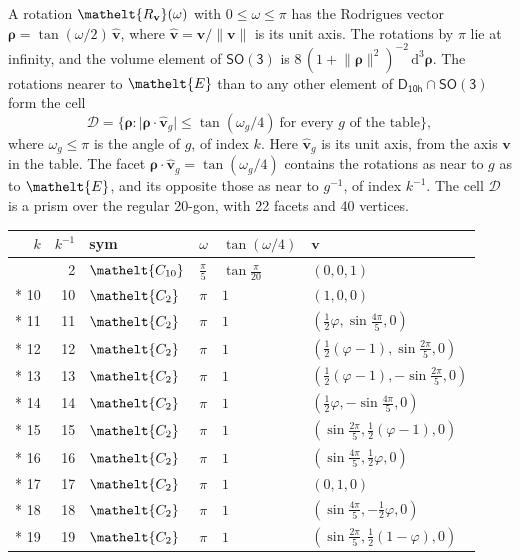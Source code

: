 \documentclass[10pt,a4paper]{article}
\numberwithin{equation}{section}
\newcommand{\eltfont}[1]{{\let\sigma\eltsigma\mathelt{#1}}}
\newcommand{\grp}[1]{\mathsf{#1}}
\newcommand{\cls}[1]{\eltfont{#1}}
\newcommand{\elt}[1]{\eltfont{#1}}
\newcommand{\dirvec}[3]{(#1, #2, #3)}
\newcommand{\unitaxis}{\hat{\mathbf{v}}}
\newcommand{\vv}{\mathbf{v}}
\newcommand{\diff}{\mathrm{d}}
\newcommand{\goldenratio}{\varphi}
\newcommand{\rodrigues}{\boldsymbol{\rho}}
\newcommand{\fcell}{\mathcal{D}}
\begin{document}
\leavevmode\label{n:vector.rodrigues}\label{n:vector.unitaxis}A rotation $\elt{R_{\vv}}(\omega)$ with $0 \le \omega \le \pi$ has the Rodrigues vector $\rodrigues = \tan(\omega/2)\,\unitaxis$, where $\unitaxis = \vv/\lVert\vv\rVert$ is its unit axis. The rotations by $\pi$ lie at infinity, and the volume element of \href{SO3.pdf}{$\grp{SO(3)}$} is $8\,(1 + \lVert\rodrigues\rVert^2)^{-2}\,\diff^3\rodrigues$.
\leavevmode\label{n:set.cell}The rotations nearer to $\elt{E}$ than to any other element of $\grp{D_{10h}} \cap \grp{SO(3)}$ form the cell
\begin{equation}\label{e:cell}\fcell = \bigl\{\rodrigues : \lvert\rodrigues\cdot\unitaxis_g\rvert \le \tan(\omega_g/4)\ \text{for every $g$ of the table}\bigr\},\end{equation}
where $\omega_g \le \pi$ is the angle of $g$, of index $k$. Here $\unitaxis_g$ is its unit axis, from the axis $\vv$ in the table. The facet $\rodrigues\cdot\unitaxis_g = \tan(\omega_g/4)$ contains the rotations as near to $g$ as to $\elt{E}$, and its opposite those as near to $g^{-1}$, of index $k^{-1}$. The cell $\fcell$ is a prism over the regular 20-gon, with 22 facets and 40 vertices.
{\small{\renewcommand{\arraystretch}{1.3}\begin{longtable}{@{}rrllll@{}}\toprule
$k$ & $k^{-1}$ & sym & $\omega$ & $\tan(\omega/4)$ & $\vv$\\\midrule\endhead
\bottomrule\endfoot\endlastfoot
1 & 2 & $\cls{C_{10}}$ & $\tfrac{\pi}{5}$ & $\tan\tfrac{\pi}{20}$ & $\dirvec{0}{0}{1}$\\*
10 & 10 & $\cls{C_{2}}$ & $\pi$ & $1$ & $\dirvec{1}{0}{0}$\\*
11 & 11 & $\cls{C_{2}}$ & $\pi$ & $1$ & $\dirvec{\tfrac{1}{2}\goldenratio{}}{\sin\tfrac{4\pi}{5}}{0}$\\*
12 & 12 & $\cls{C_{2}}$ & $\pi$ & $1$ & $\dirvec{\tfrac{1}{2}(\goldenratio - 1)}{\sin\tfrac{2\pi}{5}}{0}$\\*
13 & 13 & $\cls{C_{2}}$ & $\pi$ & $1$ & $\dirvec{\tfrac{1}{2}(\goldenratio - 1)}{-\sin\tfrac{2\pi}{5}}{0}$\\*
14 & 14 & $\cls{C_{2}}$ & $\pi$ & $1$ & $\dirvec{\tfrac{1}{2}\goldenratio{}}{-\sin\tfrac{4\pi}{5}}{0}$\\*
15 & 15 & $\cls{C_{2}}$ & $\pi$ & $1$ & $\dirvec{\sin\tfrac{2\pi}{5}}{\tfrac{1}{2}(\goldenratio - 1)}{0}$\\*
16 & 16 & $\cls{C_{2}}$ & $\pi$ & $1$ & $\dirvec{\sin\tfrac{4\pi}{5}}{\tfrac{1}{2}\goldenratio{}}{0}$\\*
17 & 17 & $\cls{C_{2}}$ & $\pi$ & $1$ & $\dirvec{0}{1}{0}$\\*
18 & 18 & $\cls{C_{2}}$ & $\pi$ & $1$ & $\dirvec{\sin\tfrac{4\pi}{5}}{-\tfrac{1}{2}\goldenratio{}}{0}$\\*
19 & 19 & $\cls{C_{2}}$ & $\pi$ & $1$ & $\dirvec{\sin\tfrac{2\pi}{5}}{\tfrac{1}{2}(1 - \goldenratio)}{0}$\\
\bottomrule\end{longtable}}}
\end{document}
